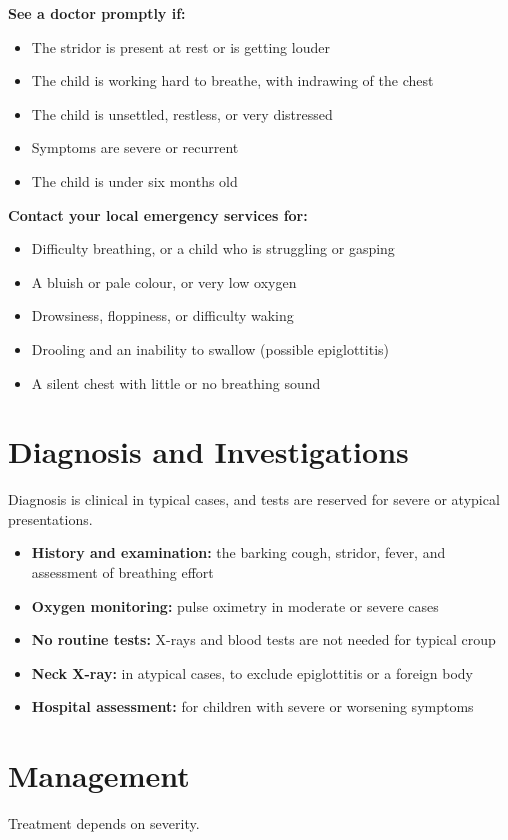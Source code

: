 \textbf{See a doctor promptly if:}
\begin{itemize}
    \item The stridor is present at rest or is getting louder
    \item The child is working hard to breathe, with indrawing of the chest
    \item The child is unsettled, restless, or very distressed
    \item Symptoms are severe or recurrent
    \item The child is under six months old
\end{itemize}

\textbf{Contact your local emergency services for:}
\begin{itemize}
    \item Difficulty breathing, or a child who is struggling or gasping
    \item A bluish or pale colour, or very low oxygen
    \item Drowsiness, floppiness, or difficulty waking
    \item Drooling and an inability to swallow (possible epiglottitis)
    \item A silent chest with little or no breathing sound
\end{itemize}

\section*{Diagnosis and Investigations}
Diagnosis is clinical in typical cases, and tests are reserved for severe or atypical presentations.

\begin{itemize}
    \item \textbf{History and examination:} the barking cough, stridor, fever, and assessment of breathing effort
    \item \textbf{Oxygen monitoring:} pulse oximetry in moderate or severe cases
    \item \textbf{No routine tests:} X-rays and blood tests are not needed for typical croup
    \item \textbf{Neck X-ray:} in atypical cases, to exclude epiglottitis or a foreign body
    \item \textbf{Hospital assessment:} for children with severe or worsening symptoms
\end{itemize}

\section*{Management}
Treatment depends on severity.

